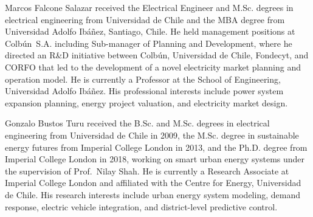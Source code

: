 \begin{IEEEbiography}{Marcos Falcone Salazar}
  received the Electrical Engineer and M.Sc. degrees in electrical
  engineering from Universidad de Chile and the MBA degree from
  Universidad Adolfo Ib\'a\~nez, Santiago, Chile.  He held management
  positions at Colb\'un~S.A. including Sub-manager of Planning and
  Development, where he directed an R\&D initiative between Colb\'un,
  Universidad de Chile, Fondecyt, and CORFO that led to the development
  of a novel electricity market planning and operation model.  He is
  currently a Professor at the School of Engineering, Universidad Adolfo
  Ib\'a\~nez.  His professional interests include power system expansion
  planning, energy project valuation, and electricity market design.
\end{IEEEbiography}

\begin{IEEEbiography}{Gonzalo Bustos Turu}
  received the B.Sc. and M.Sc. degrees in electrical engineering from
  Universidad de Chile in 2009, the M.Sc. degree in sustainable energy
  futures from Imperial College London in 2013, and the Ph.D. degree
  from Imperial College London in 2018, working on smart urban energy
  systems under the supervision of Prof.~Nilay Shah.  He is currently
  a Research Associate at Imperial College London and affiliated with
  the Centre for Energy, Universidad de Chile.  His research interests
  include urban energy system modeling, demand response, electric vehicle
  integration, and district-level predictive control.
\end{IEEEbiography}

